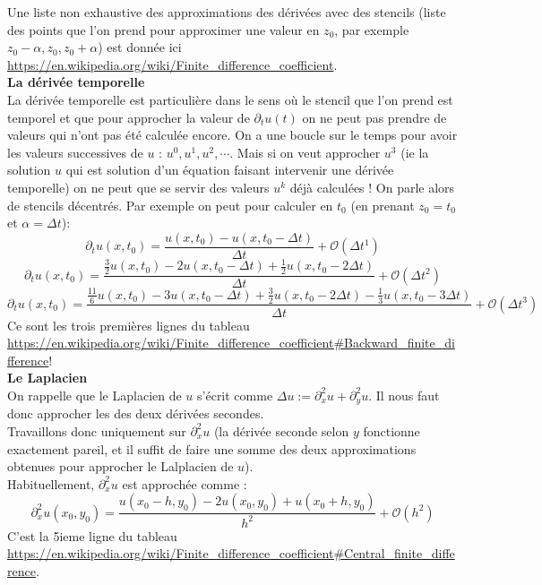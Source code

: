 \documentclass[11pt,a4paper]{article}
\newcommand{\dt}{\Delta t}
\begin{document}
Une liste non exhaustive des approximations des dérivées avec des stencils (liste des points que l'on prend pour approximer une valeur en $z_0$, par exemple $z_0-\alpha, z_0, z_0+\alpha$) est donnée ici \url{https://en.wikipedia.org/wiki/Finite_difference_coefficient}.\\

\noindent \textbf{La dérivée temporelle}\\
La dérivée temporelle est particulière dans le sens où le stencil que l'on prend est temporel et que pour approcher la valeur de $\partial_t u(t)$ on ne peut pas prendre de valeurs qui n'ont pas été calculée encore. On a une boucle sur le temps pour avoir les valeurs successives de $u$ : $u^0, u^1, u^2, \cdots$. Mais si on veut approcher $u^3$ (ie la solution $u$ qui est solution d'un équation faisant intervenir une dérivée temporelle) on ne peut que se servir des valeurs $u^k$ déjà calculées ! On parle alors de stencils décentrés. Par exemple on peut pour calculer en $t_{0}$ (en prenant $z_0 = t_0$ et $\alpha = \dt$):
\begin{equation}
    \partial_t u(x, t_0) = \frac{u(x, t_0) - u(x, t_0 - \dt)}{\dt} + \mathcal{O}(\dt^1)\label{eq:time}
\end{equation}
\begin{equation}
    \partial_t u(x, t_0) = \frac{\frac{3}{2}u(x, t_0) -2 u(x, t_0 - \dt) + \frac{1}{2}u(x, t_0 - 2\dt)}{\dt} + \mathcal{O}(\dt^2)
\end{equation}
\begin{equation}
    \partial_t u(x, t_0) = \frac{\frac{11}{6}u(x, t_0) -3 u(x, t_0 - \dt) + \frac{3}{2}u(x, t_0 - 2\dt) - \frac{1}{3}u(x, t_0-3\dt)}{\dt} + \mathcal{O}(\dt^3)
\end{equation}
Ce sont les trois premières lignes du tableau \url{https://en.wikipedia.org/wiki/Finite_difference_coefficient#Backward_finite_difference}!\\

\noindent \textbf{Le Laplacien}\\
On rappelle que le Laplacien de $u$ s'écrit comme $\Delta u := \partial_x^2 u + \partial_y^2 u$. Il nous faut donc approcher les des deux dérivées secondes.\\
Travaillons donc uniquement sur $\partial_x^2 u$ (la dérivée seconde selon $y$ fonctionne exactement pareil, et il suffit de faire une somme des deux approximations obtenues pour approcher le Lalplacien de $u$).\\
Habituellement, $\partial_x^2 u$ est approchée comme : 
\begin{equation}
    \partial_x^2 u (x_0, y_0) = \frac{u(x_0 - h, y_0) - 2 u(x_0, y_0) + u(x_0+h, y_0)}{h^2} + \mathcal{O}(h^2) \label{eq:space}
\end{equation}
C'est la 5ieme ligne du tableau \url{https://en.wikipedia.org/wiki/Finite_difference_coefficient#Central_finite_difference}.\\
\end{document}
